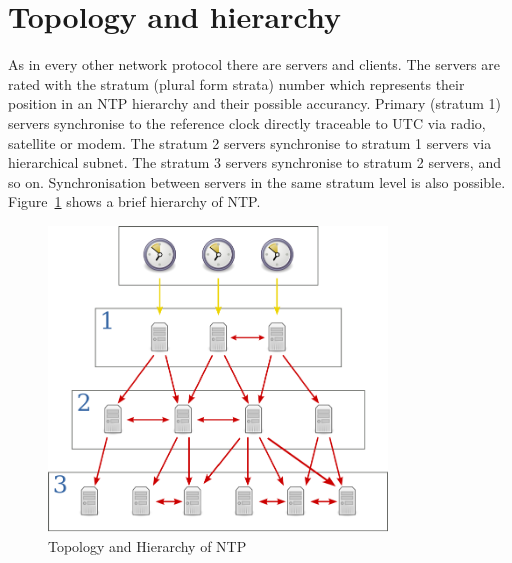
\section{Topology and hierarchy}
As in every other network protocol there are servers and clients.
The servers are rated with the stratum (plural form strata) number which represents their position
in an NTP hierarchy and their possible accurancy.
Primary (stratum 1) servers synchronise to the reference clock directly traceable to UTC via
radio, satellite or modem.
The stratum 2 servers synchronise to stratum 1
servers via hierarchical subnet.
The stratum 3 servers synchronise to stratum 2 servers, and so on.
Synchronisation between servers in the same stratum level is also possible.
Figure~\ref{fig:ntp-hierarchy} shows a brief hierarchy of NTP.
\begin{figure}
  \centering
  \includegraphics[width=9cm,keepaspectratio]{fig/Network_Time_Protocol_servers_and_clients.pdf}
  \caption{Topology and Hierarchy of NTP}
  \label{fig:ntp-hierarchy}
  \bigskip
\end{figure}

